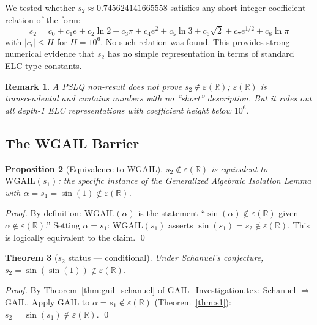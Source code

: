 \documentclass[11pt]{article}
\newtheorem{theorem}{Theorem}
\newtheorem{proposition}[theorem]{Proposition}
\newtheorem{remark}[theorem]{Remark}
\begin{document}
We tested whether $s_2 \approx 0.745624141665558$ satisfies any short
integer-coefficient relation of the form:
\[
s_2 = c_0 + c_1 e + c_2 \ln 2 + c_3 \pi + c_4 e^2 + c_5 \ln 3 + c_6 \sqrt{2}
+ c_7 e^{1/2} + c_8 \ln\pi
\]
with $|c_i| \leq H$ for $H = 10^6$. No such relation was found.
This provides strong numerical evidence that $s_2$ has no simple
representation in terms of standard ELC-type constants.

\begin{remark}
A PSLQ non-result does not prove $s_2 \notin \varepsilon(\mathbb{R})$;
$\varepsilon(\mathbb{R})$ is transcendental and contains numbers with no
``short'' description. But it rules out all depth-1 ELC representations with
coefficient height below $10^6$.
\end{remark}

\subsection{The WGAIL Barrier}

\begin{proposition}[Equivalence to WGAIL]
\label{prop:equiv}
$s_2 \notin \varepsilon(\mathbb{R})$ is equivalent to
$\mathrm{WGAIL}(s_1)$: the specific instance of the Generalized Algebraic
Isolation Lemma with $\alpha = s_1 = \sin(1) \notin \varepsilon(\mathbb{R})$.
\end{proposition}

\begin{proof}
By definition: $\mathrm{WGAIL}(\alpha)$ is the statement
``$\sin(\alpha) \notin \varepsilon(\mathbb{R})$ given $\alpha \notin \varepsilon(\mathbb{R})$.''
Setting $\alpha = s_1$: $\mathrm{WGAIL}(s_1)$ asserts $\sin(s_1) = s_2 \notin \varepsilon(\mathbb{R})$.
This is logically equivalent to the claim. \qed
\end{proof}

\begin{theorem}[$s_2$ status — conditional]
\label{thm:s2_conditional}
Under Schanuel's conjecture, $s_2 = \sin(\sin(1)) \notin \varepsilon(\mathbb{R})$.
\end{theorem}

\begin{proof}
By Theorem~\ref{thm:gail_schanuel} of GAIL\_Investigation.tex:
Schanuel $\Rightarrow$ GAIL. Apply GAIL to $\alpha = s_1 \notin \varepsilon(\mathbb{R})$
(Theorem~\ref{thm:s1}): $s_2 = \sin(s_1) \notin \varepsilon(\mathbb{R})$. \qed
\end{proof}
\end{document}

